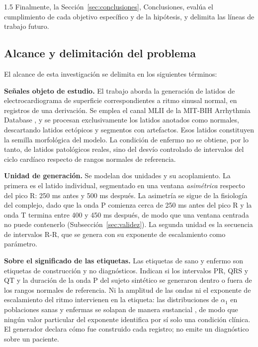 \begin{spacing}{1.5}
Finalmente, la Sección~\ref{sec:conclusiones}, Conclusiones, evalúa el cumplimiento de cada objetivo específico y de la hipótesis, y delimita las líneas de trabajo futuro.


\subsection{Alcance y delimitación del problema}

El alcance de esta investigación se delimita en los siguientes términos:

\textbf{Señales objeto de estudio.} El trabajo aborda la generación de latidos de electrocardiograma de superficie correspondientes a ritmo sinusal normal, en registros de una derivación. Se emplea el canal MLII de la MIT-BIH Arrhythmia Database \cite{moody2001impact}, y se procesan exclusivamente los latidos anotados como normales, descartando latidos ectópicos y segmentos con artefactos. Esos latidos constituyen la semilla morfológica del modelo. La condición de enfermo no se obtiene, por lo tanto, de latidos patológicos reales, sino del desvío controlado de intervalos del ciclo cardíaco respecto de rangos normales de referencia.

\textbf{Unidad de generación.} Se modelan dos unidades y su acoplamiento. La primera es el latido individual, segmentado en una ventana \emph{asimétrica} respecto del pico R: 250 ms antes y 500 ms después. La asimetría se sigue de la fisiología del complejo, dado que la onda P comienza cerca de 250 ms antes del pico R y la onda T termina entre 400 y 450 ms después, de modo que una ventana centrada no puede contenerlo (Subsección~\ref{sec:validez}). La segunda unidad es la secuencia de intervalos R-R, que se genera con su exponente de escalamiento como parámetro.

\textbf{Sobre el significado de las etiquetas.} Las etiquetas de sano y enfermo son etiquetas de construcción y no diagnósticos. Indican si los intervalos PR, QRS y QT y la duración de la onda P del sujeto sintético se generaron dentro o fuera de los rangos normales de referencia. Ni la amplitud de las ondas ni el exponente de escalamiento del ritmo intervienen en la etiqueta: las distribuciones de $\alpha_1$ en poblaciones sanas y enfermas se solapan de manera sustancial \cite{costa2017fragmentation}, de modo que ningún valor particular del exponente identifica por sí solo una condición clínica. El generador declara cómo fue construido cada registro; no emite un diagnóstico sobre un paciente.


\end{spacing}
